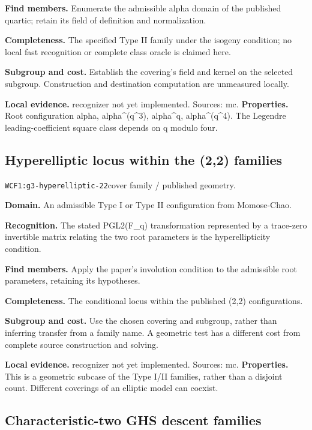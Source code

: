 \documentclass[10pt]{article}
\begin{document}
\textbf{Find members.} Enumerate the admissible alpha domain of the published quartic; retain its field of definition and normalization.\par
\textbf{Completeness.} The specified Type II family under the isogeny condition; no local fast recognition or complete class oracle is claimed here.\par
\textbf{Subgroup and cost.} Establish the covering's field and kernel on the selected subgroup. Construction and destination computation are unmeasured locally.\par
\textbf{Local evidence.} recognizer not yet implemented. Sources: mc.
\textbf{Properties.} Root configuration alpha, alpha\textasciicircum{}(q\textasciicircum{}3), alpha\textasciicircum{}q, alpha\textasciicircum{}(q\textasciicircum{}4). The Legendre leading-coefficient square class depends on q modulo four.\par
{}\subsection{Hyperelliptic locus within the (2,2) families}
\texttt{WCF1:g3-hyperelliptic-22}\quad cover family / published geometry.\par
\textbf{Domain.} An admissible Type I or Type II configuration from Momose-Chao.\par
\textbf{Recognition.} The stated PGL2(F\_q) transformation represented by a trace-zero invertible matrix relating the two root parameters is the hyperellipticity condition.\par
\textbf{Find members.} Apply the paper's involution condition to the admissible root parameters, retaining its hypotheses.\par
\textbf{Completeness.} The conditional locus within the published (2,2) configurations.\par
\textbf{Subgroup and cost.} Use the chosen covering and subgroup, rather than inferring transfer from a family name. A geometric test has a different cost from complete source construction and solving.\par
\textbf{Local evidence.} recognizer not yet implemented. Sources: mc.
\textbf{Properties.} This is a geometric subcase of the Type I/II families, rather than a disjoint count. Different coverings of an elliptic model can coexist.\par
{}\subsection{Characteristic-two GHS descent families}
\end{document}
